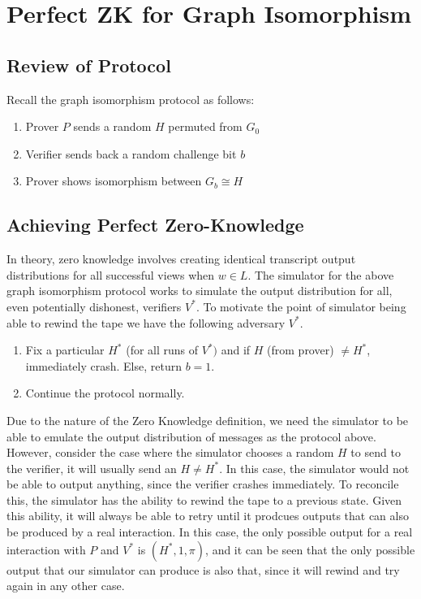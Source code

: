 \documentclass[11pt]{article}
\begin{document}
\section{Perfect ZK for Graph Isomorphism}
\subsection{Review of Protocol}
Recall the graph isomorphism protocol as follows:
\begin{enumerate}
    \item Prover $P$ sends a random $H$ permuted from $G_0$
    \item Verifier sends back a random challenge bit $b$
    \item Prover shows isomorphism between $G_b \cong H$
\end{enumerate}

\subsection{Achieving Perfect Zero-Knowledge}
In theory, zero knowledge involves creating identical transcript output distributions for all successful views when $w \in L$. The simulator for the above graph isomorphism protocol works to simulate the output distribution for all, even potentially dishonest, verifiers $V^*$. To motivate the point of simulator being able to rewind the tape we have the following adversary $V^*$.
\begin{enumerate}
    \item Fix a particular $H^*$ (for all runs of $V^*)$ and if $H$ (from prover) $\neq H^*$, immediately crash. Else, return $b=1$.
    \item Continue the protocol normally.
\end{enumerate}
Due to the nature of the Zero Knowledge definition, we need the simulator to be able to emulate the output distribution of messages as the protocol above. However, consider the case where the simulator chooses a random $H$ to send to the verifier, it will usually send an $H \neq H^*$. In this case, the simulator would not be able to output anything, since the verifier crashes immediately. To reconcile this, the simulator has the ability to rewind the tape to a previous state. Given this ability, it will always be able to retry until it prodcues outputs that can also be produced by a real interaction. In this case, the only possible output for a real interaction with $P$ and $V^*$ is $(H^*,1,\pi)$, and it can be seen that the only possible output that our simulator can produce is also that, since it will rewind and try again in any other case.
\end{document}
